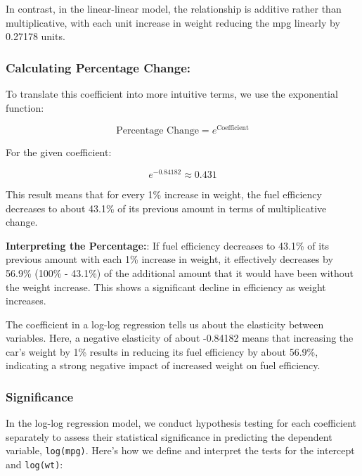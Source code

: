 \documentclass[
  letterpaper,
  DIV=11,
  numbers=noendperiod]{scrreport}
\begin{document}
In contrast, in the linear-linear model, the relationship is additive
rather than multiplicative, with each unit increase in weight reducing
the mpg linearly by 0.27178 units.

\subsubsection{\texorpdfstring{\textbf{Calculating Percentage
Change:}}{Calculating Percentage Change:}}\label{calculating-percentage-change}

To translate this coefficient into more intuitive terms, we use the
exponential function:

\[
\text{Percentage Change} = e^{\text{Coefficient}}
\]

For the given coefficient:

\[
e^{-0.84182} \approx 0.431
\]

This result means that for every 1\% increase in weight, the fuel
efficiency decreases to about 43.1\% of its previous amount in terms of
multiplicative change.

\textbf{Interpreting the Percentage:}: If fuel efficiency decreases to
43.1\% of its previous amount with each 1\% increase in weight, it
effectively decreases by 56.9\% (100\% - 43.1\%) of the additional
amount that it would have been without the weight increase. This shows a
significant decline in efficiency as weight increases.

The coefficient in a log-log regression tells us about the elasticity
between variables. Here, a negative elasticity of about -0.84182 means
that increasing the car's weight by 1\% results in reducing its fuel
efficiency by about 56.9\%, indicating a strong negative impact of
increased weight on fuel efficiency.

\subsubsection{Significance}\label{significance}

In the log-log regression model, we conduct hypothesis testing for each
coefficient separately to assess their statistical significance in
predicting the dependent variable, \texttt{log(mpg)}. Here's how we
define and interpret the tests for the intercept and \texttt{log(wt)}:
\end{document}
